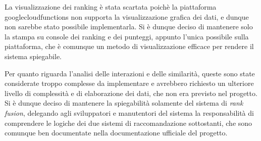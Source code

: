 La visualizzazione dei ranking è stata scartata poichè la piattaforma \gls{googlecloudfunctions} non supporta la visualizzazione grafica dei dati, e dunque non sarebbe stato possibile implementarla. Si è dunque deciso di mantenere solo la stampa su console dei ranking e dei punteggi, appunto l'unica possibile sulla piattaforma, che è comunque un metodo di visualizzazione efficace per rendere il sistema spiegabile.

Per quanto riguarda l'analisi delle interazioni e delle similarità, queste sono state considerate troppo complesse da implementare e avrebbero richiesto un ulteriore livello di complessità e di elaborazione dei dati, che non era previsto nel progetto.
Si è dunque deciso di mantenere la spiegabilità solamente del sistema di \emph{rank fusion}, delegando agli sviluppatori e manutentori del sistema la responsabilità di comprendere le logiche dei due sistemi di raccomandazione sottostanti, che sono comunque ben documentate nella documentazione ufficiale del progetto.
